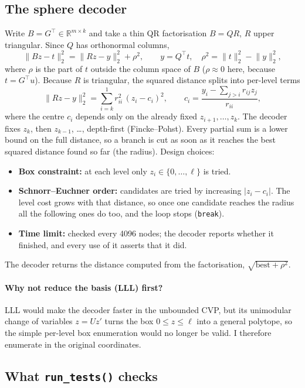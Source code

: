 \documentclass[11pt,a4paper]{article}
\newcommand{\R}{\mathbb{R}}
\newcommand{\norm}[1]{\lVert #1\rVert_2}
\begin{document}
\subsection{The sphere decoder}\label{sec:sd}

Write $B=G^\top\in\R^{m\times k}$ and take a thin QR factorisation $B=QR$, $R$ upper triangular. Since $Q$ has orthonormal columns,
\[
  \norm{Bz-t}^2=\norm{Rz-y}^2+\rho^2,\qquad y=Q^\top t,\quad \rho^2=\norm{t}^2-\norm{y}^2 ,
\]
where $\rho$ is the part of $t$ outside the column space of $B$ ($\rho\approx0$ here, because $t=G^\top u$). Because $R$ is triangular, the squared distance splits into per-level terms
\[
  \norm{Rz-y}^2=\sum_{i=k}^{1} r_{ii}^2\,(z_i-c_i)^2,\qquad c_i=\frac{y_i-\sum_{j>i} r_{ij}z_j}{r_{ii}},
\]
where the centre $c_i$ depends only on the already fixed $z_{i+1},\dots,z_k$. The decoder fixes $z_k$, then $z_{k-1}$, \dots, depth-first (Fincke--Pohst). Every partial sum is a lower bound on the full distance, so a branch is cut as soon as it reaches the best squared distance found so far (the radius). Design choices:
\begin{itemize}
  \item \textbf{Box constraint:} at each level only $z_i\in\{0,\dots,\ell\}$ is tried.
  \item \textbf{Schnorr--Euchner order:} candidates are tried by increasing $|z_i-c_i|$. The level cost grows with that distance, so once one candidate reaches the radius all the following ones do too, and the loop stops (\texttt{break}).
  \item \textbf{Time limit:} checked every 4096 nodes; the decoder reports whether it finished, and every use of it asserts that it did.
\end{itemize}
The decoder returns the distance computed from the factorisation, $\sqrt{\text{best}+\rho^2}$.

\paragraph{Why not reduce the basis (LLL) first?} LLL would make the decoder faster in the unbounded CVP, but its unimodular change of variables $z=Uz'$ turns the box $0\le z\le\ell$ into a general polytope, so the simple per-level box enumeration would no longer be valid. I therefore enumerate in the original coordinates.

\subsection{What \texttt{run\_tests()} checks}
\end{document}
